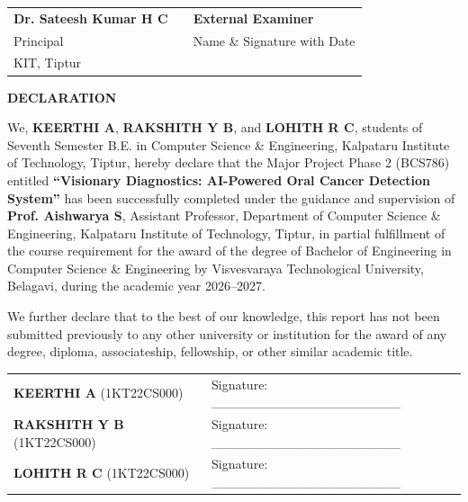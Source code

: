 \documentclass[12pt,a4paper,oneside]{report}
\newcommand{\projecttitle}{Visionary Diagnostics: AI-Powered Oral Cancer Detection System}
\newcommand{\guidename}{Prof. Aishwarya S}
\newcommand{\principalname}{Dr. Sateesh Kumar H C}
\begin{document}
\vspace{1.5cm}

\noindent
\begin{tabular}{p{5cm}p{3cm}p{5cm}}
\textbf{\principalname} & & \textbf{External Examiner} \\
Principal & & Name \& Signature with Date \\
KIT, Tiptur & & \\
\end{tabular}

\newpage
\thispagestyle{plain}
\begin{center}
\textbf{\fontsize{16}{19}\selectfont DECLARATION}\\[0.8cm]
\end{center}

We, \textbf{KEERTHI A}, \textbf{RAKSHITH Y B}, and \textbf{LOHITH R C}, students of Seventh Semester B.E. in Computer Science \& Engineering, Kalpataru Institute of Technology, Tiptur, hereby declare that the Major Project Phase 2 (BCS786) entitled \textbf{``\projecttitle''} has been successfully completed under the guidance and supervision of \textbf{\guidename}, Assistant Professor, Department of Computer Science \& Engineering, Kalpataru Institute of Technology, Tiptur, in partial fulfillment of the course requirement for the award of the degree of Bachelor of Engineering in Computer Science \& Engineering by Visvesvaraya Technological University, Belagavi, during the academic year 2026--2027.

We further declare that to the best of our knowledge, this report has not been submitted previously to any other university or institution for the award of any degree, diploma, associateship, fellowship, or other similar academic title.

\vspace{1.2cm}

\noindent
\begin{tabular}{l l}
\textbf{KEERTHI A} (1KT22CS000) & Signature: \_\_\_\_\_\_\_\_\_\_\_\_\_\_\_\_\_\_\_\_ \\[0.6cm]
\textbf{RAKSHITH Y B} (1KT22CS000) & Signature: \_\_\_\_\_\_\_\_\_\_\_\_\_\_\_\_\_\_\_\_ \\[0.6cm]
\textbf{LOHITH R C} (1KT22CS000) & Signature: \_\_\_\_\_\_\_\_\_\_\_\_\_\_\_\_\_\_\_\_ \\[0.6cm]
\end{tabular}

\vspace{1.0cm}
\end{document}
